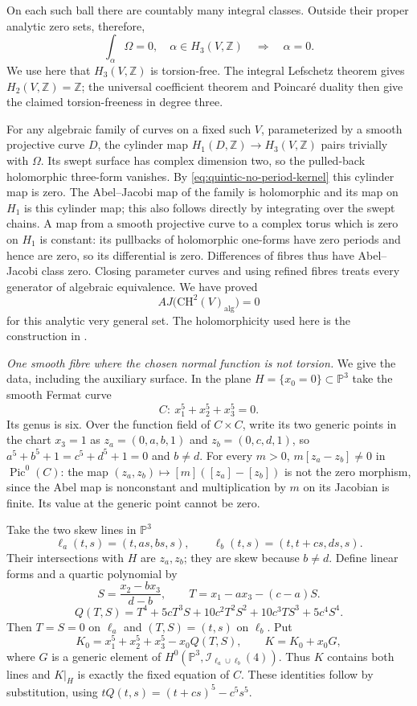 On each such ball there are countably many integral classes.
Outside their proper analytic zero sets, therefore,
\begin{equation}\label{eq:quintic-no-period-kernel}
 \int_\alpha\Omega=0,\quad \alpha\in H_3(V,\mathbb Z)
                     \quad\Longrightarrow\quad \alpha=0.
\end{equation}
We use here that $H_3(V,\mathbb Z)$ is torsion-free. The integral
Lefschetz theorem gives $H_2(V,\mathbb Z)=\mathbb Z$;
the universal coefficient theorem and Poincar\'e duality then give the
claimed torsion-freeness in degree three.

For any algebraic family of curves on a fixed such $V$, parameterized
by a smooth projective curve $D$, the cylinder map
$H_1(D,\mathbb Z)\to H_3(V,\mathbb Z)$ pairs trivially with $\Omega$.
Its swept surface has complex dimension two, so the pulled-back
holomorphic three-form vanishes. By
\eqref{eq:quintic-no-period-kernel} this cylinder map is zero.
The Abel--Jacobi map of the family is holomorphic and its map on
$H_1$ is this cylinder map; this also follows directly by integrating
over the swept chains. A map from a smooth projective curve to a
complex torus which is zero on $H_1$ is constant: its pullbacks of
holomorphic one-forms have zero periods and hence are zero, so its
differential is zero. Differences of fibres thus have Abel--Jacobi
class zero. Closing parameter curves and using refined fibres treats
every generator of algebraic equivalence. We have proved
\[
 AJ\bigl(\mathrm{CH}^2(V)_{\mathrm{alg}}\bigr)=0
\]
for this analytic very general set. The holomorphicity used here is
the construction in \citet[Theorem (2.20), pp.~826--827]{cyGriffiths1968}.

\emph{One smooth fibre where the chosen normal function is not torsion.}
We give the data, including the auxiliary surface. In the plane
$H=\{x_0=0\}\subset\mathbb P^3$ take the smooth Fermat curve
\[
 C:\ x_1^5+x_2^5+x_3^5=0.
\]
Its genus is six. Over the function field of $C\times C$, write its
two generic points in the chart $x_3=1$ as
$z_a=(0,a,b,1)$ and $z_b=(0,c,d,1)$, so
$a^5+b^5+1=c^5+d^5+1=0$ and $b\ne d$.
For every $m>0$, $m[z_a-z_b]\ne0$ in $\operatorname{Pic}^0(C)$:
the map $(z_a,z_b)\mapsto[m]([z_a]-[z_b])$ is not the zero morphism,
since the Abel map is nonconstant and multiplication by $m$ on its
Jacobian is finite. Its value at the generic point cannot be zero.

Take the two skew lines in $\mathbb P^3$
\[
 \ell_a(t,s)=(t,as,bs,s),\qquad
 \ell_b(t,s)=(t,t+cs,ds,s).
\]
Their intersections with $H$ are $z_a,z_b$; they are skew because
$b\ne d$. Define linear forms and a quartic polynomial by
\[
 S=\frac{x_2-bx_3}{d-b},\qquad T=x_1-ax_3-(c-a)S.
\]
\[
 Q(T,S)=T^4+5cT^3S+10c^2T^2S^2+10c^3TS^3+5c^4S^4.
\]
Then $T=S=0$ on $\ell_a$ and $(T,S)=(t,s)$ on $\ell_b$.
Put
\[
 K_0=x_1^5+x_2^5+x_3^5-x_0Q(T,S),\qquad
 K=K_0+x_0G,
\]
where $G$ is a generic element of
$H^0(\mathbb P^3,\mathcal I_{\ell_a\cup\ell_b}(4))$.
Thus $K$ contains both lines and $K|_H$ is exactly the fixed equation
of $C$. These identities follow by substitution, using
$tQ(t,s)=(t+cs)^5-c^5s^5$.

